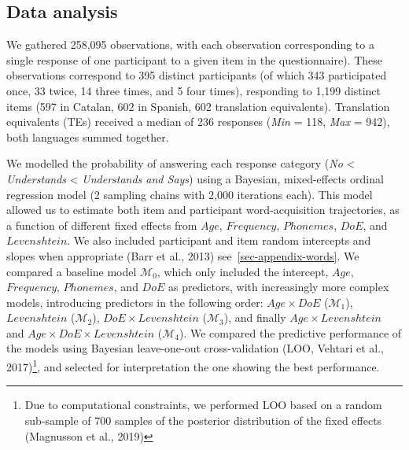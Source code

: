 \documentclass[
  letterpaper,
  DIV=11,
  numbers=noendperiod]{scrartcl}
\begin{document}
\hypertarget{sec-analysis}{%
\subsection{Data analysis}\label{sec-analysis}}

We gathered 258,095 observations, with each observation corresponding to
a single response of one participant to a given item in the
questionnaire). These observations correspond to 395 distinct
participants (of which 343 participated once, 33 twice, 14 three times,
and 5 four times), responding to 1,199 distinct items (597 in Catalan,
602 in Spanish, 602 translation equivalents). Translation equivalents
(TEs) received a median of 236 responses (\emph{Min} = 118, \emph{Max} =
942), both languages summed together.

We modelled the probability of answering each response category
(\emph{No} \textless{} \emph{Understands} \textless{} \emph{Understands
and Says}) using a Bayesian, mixed-effects ordinal regression model (2
sampling chains with 2,000 iterations each). This model allowed us to
estimate both item and participant word-acquisition trajectories, as a
function of different fixed effects from \(Age\), \(Frequency\),
\(Phonemes\), \(DoE\), and \(Levenshtein\). We also included participant
and item random intercepts and slopes when appropriate (Barr et al.,
2013) see~\ref{sec-appendix-words}. We compared a baseline model
\(\mathcal{M}_{0}\), which only included the intercept, \(Age\),
\(Frequency\), \(Phonemes\), and \(DoE\) as predictors, with
increasingly more complex models, introducing predictors in the
following order: \(Age \times DoE\) (\(\mathcal{M}_{1}\)),
\(Levenshtein\) (\(\mathcal{M}_{2}\)), \(DoE \times Levenshtein\)
(\(\mathcal{M}_{3}\)), and finally \(Age \times Levenshtein\) and
\(Age \times DoE \times Levenshtein\) (\(\mathcal{M}_{4}\)). We compared
the predictive performance of the models using Bayesian leave-one-out
cross-validation (LOO, Vehtari et al., 2017)\footnote{Due to
  computational constraints, we performed LOO based on a random
  sub-sample of 700 samples of the posterior distribution of the fixed
  effects (Magnusson et al., 2019)}, and selected for interpretation the
one showing the best performance.
\end{document}
